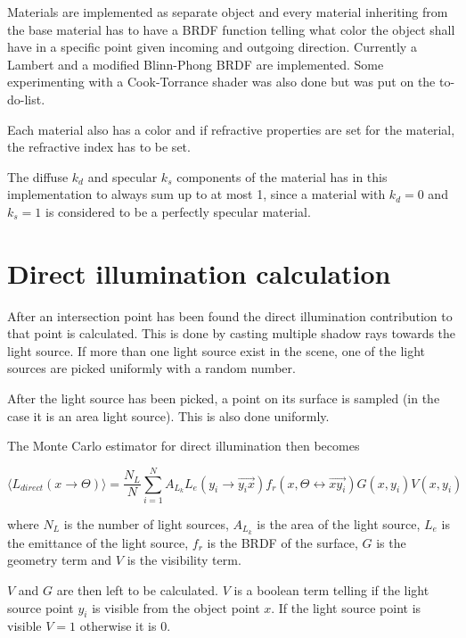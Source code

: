 \documentclass[a4paper]{report}
\begin{document}
Materials are implemented as separate object and every material
inheriting from the base material has to have a BRDF function telling
what color the object shall have in a specific point given incoming
and outgoing direction. Currently a Lambert and a modified Blinn-Phong
BRDF are implemented. Some experimenting with a Cook-Torrance shader
was also done but was put on the to-do-list.

Each material also has a color and if refractive properties are set
for the material, the refractive index has to be set.

The diffuse \(k_d\) and specular \(k_s\) components of the material
has in this implementation to always sum up to at most 1, since a
material with \(k_d = 0\) and \(k_s = 1\) is considered to be a
perfectly specular material. 

\section{Direct illumination calculation}

After an intersection point has been found the direct illumination
contribution to that point is calculated. This is done by casting
multiple shadow rays towards the light source. If more than one light
source exist in the scene, one of the light sources are picked
uniformly with a random number. 

After the light source has been picked, a point on its surface is
sampled (in the case it is an area light source). This is also done uniformly.

The Monte Carlo estimator for direct illumination then becomes

\begin{equation}
  \langle L_{direct}(x \to \Theta) \rangle = \frac{N_L}{N}\sum^N_{i=1}
  A_{L_k}L_e(y_i \to \vec{y_ix})f_r(x,\Theta \leftrightarrow
  \vec{xy_i})G(x,y_i)V(x,y_i)
  \label{eq:direst}
\end{equation}

where \(N_L\) is the number of light sources, \(A_{L_k}\) is the area
of the light source, \(L_e\) is the emittance of the light source,
\(f_r\) is the BRDF of the surface, \(G\) is the geometry term and \(V\) is the
visibility term.

\(V\) and \(G\) are then left to be calculated. \(V\) is a boolean
term telling if the light source point \(y_i\) is visible from the
object point \(x\). If the light source point is visible \(V = 1\)
otherwise it is \(0\).
\end{document}
